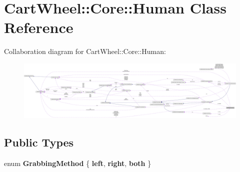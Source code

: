 \hypertarget{classCartWheel_1_1Core_1_1Human}{
\section{CartWheel::Core::Human Class Reference}
\label{classCartWheel_1_1Core_1_1Human}
}


Collaboration diagram for CartWheel::Core::Human:\nopagebreak
\begin{figure}[H]
\begin{center}
\leavevmode
\includegraphics[width=400pt]{classCartWheel_1_1Core_1_1Human__coll__graph}
\end{center}
\end{figure}
\subsection*{Public Types}
\begin{DoxyCompactItemize}
\item 
enum {\bfseries GrabbingMethod} \{ {\bfseries left}, 
{\bfseries right}, 
{\bfseries both}
 \}
\end{DoxyCompactItemize}
